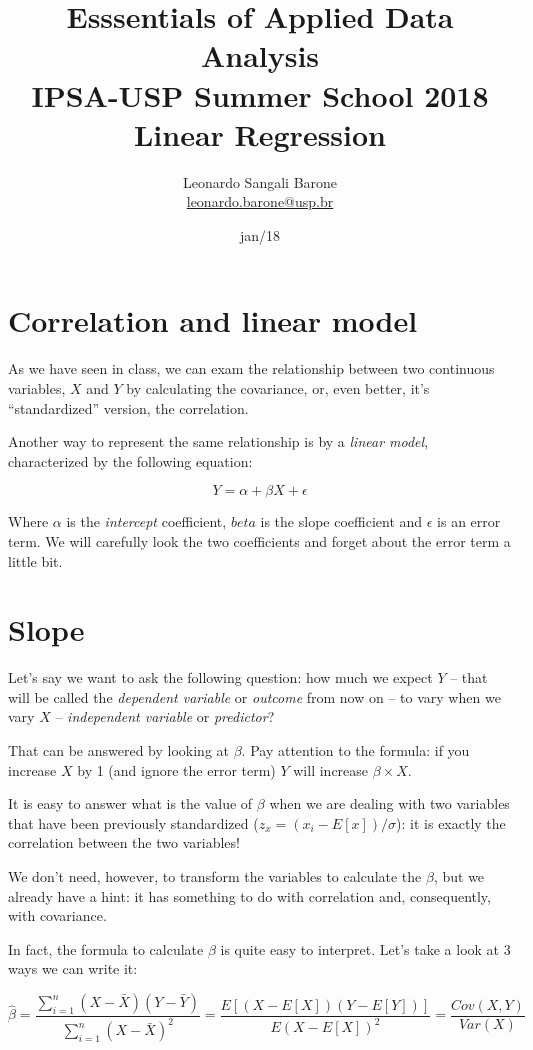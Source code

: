 \documentclass[11pt]{article}
\title{\textbf{Esssentials of Applied Data Analysis\\
				IPSA-USP Summer School 2018}\newline\\
				Linear Regression}
\author{Leonardo Sangali Barone\\ \href{leonardo.barone@usp.br}{leonardo.barone@usp.br}}
\date{jan/18}
\begin{document}
\maketitle

\section*{Correlation and linear model}

As we have seen in class, we can exam the relationship between two continuous variables, $X$ and $Y$ by calculating the covariance, or, even better, it's ``standardized'' version, the correlation.

Another way to represent the same relationship is by a \emph{linear model}, characterized by the following equation:

\[Y = \alpha + \beta X + \epsilon\]

Where $\alpha$ is the \emph{intercept} coefficient, $beta$ is the slope coefficient and $\epsilon$ is an error term. We will carefully look the two coefficients and forget about the error term a little bit.

\section*{Slope}

Let's say we want to ask the following question: how much we expect $Y$ -- that will be called the \emph{dependent variable} or \emph{outcome} from now on -- to vary when we vary $X$ -- \emph{independent variable} or \emph{predictor}?

That can be answered by looking at $\beta$. Pay attention to the formula: if you increase $X$ by 1 (and ignore the error term) $Y$ will increase $ \beta \times X$.

It is easy to answer what is the value of $\beta$ when we are dealing with two variables that have been previously standardized ($z_x = (x_i - E[x]) / \sigma$): it is exactly the correlation between the two variables!

We don't need, however, to transform the variables to calculate the $\beta$, but we already have a hint: it has something to do with correlation and, consequently, with covariance.

In fact, the formula to calculate $\beta$ is quite easy to interpret. Let's take a look at 3 ways we can write it:

\[\hat{\beta} = \frac{\sum^n_{i=1} (X-\bar{X}) (Y-\bar{Y})}{\sum^n_{i=1} (X-\bar{X})^2}  = \frac{E[(X-E[X]) (Y-E[Y])]}{E{(X-E[X])^2}} =  \frac{Cov(X,Y)}{Var(X)}\]
\end{document}
